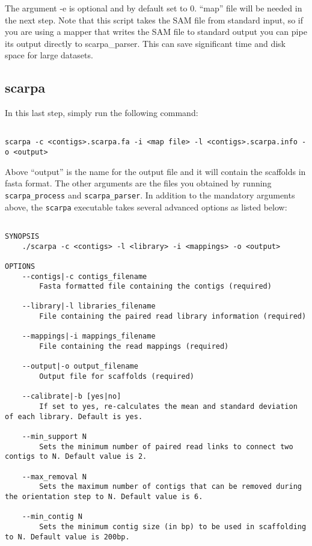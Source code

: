 \documentclass[12pt,a4paper]{report}
\begin{document}
The argument -e is optional and by default set to 0. ``map'' file will be needed in the next step. Note that this script takes the SAM file from standard input, so if you are using a mapper that writes the SAM file to standard output you can pipe its output directly to scarpa\_parser. This can save significant time and disk space for large datasets.

\subsection{scarpa}

In this last step, simply run the following command:

\begin{lstlisting}

scarpa -c <contigs>.scarpa.fa -i <map file> -l <contigs>.scarpa.info -o <output>

\end{lstlisting}

Above ``output'' is the name for the output file and it will contain the scaffolds in fasta format. The other arguments are the files you obtained by running \texttt{scarpa\_process} and \texttt{scarpa\_parser}. In addition to the mandatory arguments above, the \texttt{scarpa} executable takes several advanced options as listed below:

\begin{lstlisting}

SYNOPSIS
    ./scarpa -c <contigs> -l <library> -i <mappings> -o <output> 

OPTIONS 
    --contigs|-c contigs_filename 
        Fasta formatted file containing the contigs (required)

    --library|-l libraries_filename 
        File containing the paired read library information (required)

    --mappings|-i mappings_filename 
        File containing the read mappings (required)

    --output|-o output_filename 
        Output file for scaffolds (required)

    --calibrate|-b [yes|no] 
        If set to yes, re-calculates the mean and standard deviation of each library. Default is yes. 

    --min_support N 
        Sets the minimum number of paired read links to connect two contigs to N. Default value is 2. 

    --max_removal N 
        Sets the maximum number of contigs that can be removed during the orientation step to N. Default value is 6. 

    --min_contig N 
        Sets the minimum contig size (in bp) to be used in scaffolding to N. Default value is 200bp.

\end{lstlisting}
\end{document}
